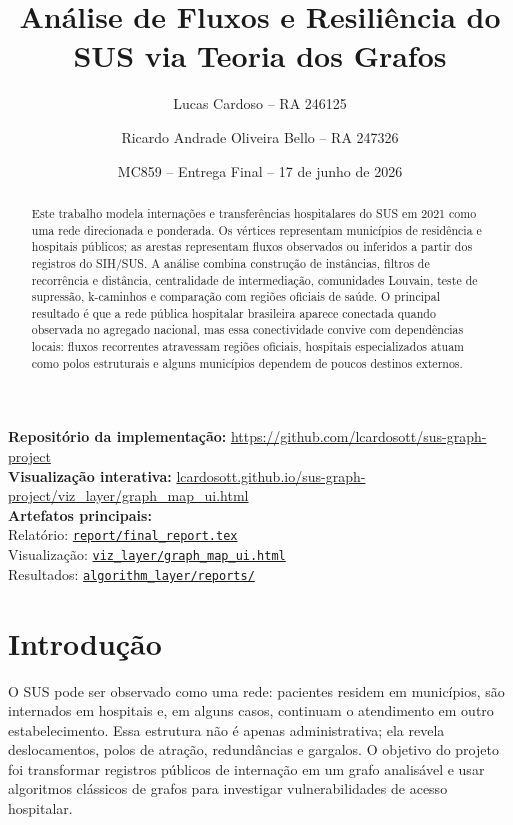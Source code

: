 \documentclass[10pt,a4paper]{article}
\title{\vspace{-1.15cm}Análise de Fluxos e Resiliência do SUS via Teoria dos Grafos}
\author{Lucas Cardoso -- RA 246125 \and Ricardo Andrade Oliveira Bello -- RA 247326}
\date{MC859 -- Entrega Final -- 17 de junho de 2026}
\newcommand{\repo}{https://github.com/lcardosott/sus-graph-project}
\newcommand{\repobranch}{gh-pages}
\newcommand{\ghfile}[2]{\href{\repo/blob/\repobranch/#1}{\texttt{#2}}}
\begin{document}
\maketitle

\textbf{Repositório da implementação:} \url{https://github.com/lcardosott/sus-graph-project}\\
\textbf{Visualização interativa:} \href{https://lcardosott.github.io/sus-graph-project/viz_layer/graph_map_ui.html}{lcardosott.github.io/sus-graph-project/viz\_layer/graph\_map\_ui.html}\\
\textbf{Artefatos principais:}\\
Relatório: \ghfile{report/final_report.tex}{\texttt{report/final\_report.tex}}\\
Visualização: \ghfile{viz_layer/graph_map_ui.html}{\texttt{viz\_layer/graph\_map\_ui.html}}\\
Resultados: \ghfile{algorithm_layer/reports/final_analysis_interpretation.md}{\texttt{algorithm\_layer/reports/}}

\begin{abstract}
Este trabalho modela internações e transferências hospitalares do SUS em 2021 como uma rede direcionada e ponderada. Os vértices representam municípios de residência e hospitais públicos; as arestas representam fluxos observados ou inferidos a partir dos registros do SIH/SUS. A análise combina construção de instâncias, filtros de recorrência e distância, centralidade de intermediação, comunidades Louvain, teste de supressão, k-caminhos e comparação com regiões oficiais de saúde. O principal resultado é que a rede pública hospitalar brasileira aparece conectada quando observada no agregado nacional, mas essa conectividade convive com dependências locais: fluxos recorrentes atravessam regiões oficiais, hospitais especializados atuam como polos estruturais e alguns municípios dependem de poucos destinos externos.
\end{abstract}

\section{Introdução}

O SUS pode ser observado como uma rede: pacientes residem em municípios, são internados em hospitais e, em alguns casos, continuam o atendimento em outro estabelecimento. Essa estrutura não é apenas administrativa; ela revela deslocamentos, polos de atração, redundâncias e gargalos. O objetivo do projeto foi transformar registros públicos de internação em um grafo analisável e usar algoritmos clássicos de grafos para investigar vulnerabilidades de acesso hospitalar.
\end{document}
